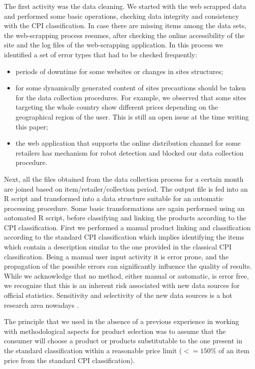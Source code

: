 \documentclass[]{article}
\begin{document}
The first activity was the data cleaning. We started with 
the web scrapped data and performed some basic operations, checking data integrity and consistency with the CPI classification. 
In case there are missing items among the data sets, the web-scrapping process resumes, after checking the online accessibility 
of the site and the log files of the web-scrapping application. In this process we identified a set of error types that had to be checked frequently: 
\begin{itemize}
\item periods of downtime for some websites or changes in sites structures;
\item for some dynamically generated content of sites precautions should be taken for the data collection procedures. For example, we observed that some sites targeting the whole country show different prices depending on the geographical region of the user. This is still an open issue at the time writing this paper;
\item the web application that supports the online distribution channel for some retailers has mechanism for robot detection and blocked our data collection 
procedure.
\end{itemize}


Next, all the files obtained from the data collection process for a certain month are joined based on item/retailer/collection period. The output 
file is fed into an R script and transformed into a data structure suitable for an automatic processing procedure. Some 
basic transformations are again performed using an automated R script, before classifying and linking the products according 
to the CPI classification. First we performed a manual product linking and classification according to the standard CPI 
classification which implies identifying the items which contain a description similar to the one provided in the
classical CPI classification. Being a manual user input activity it is error prone, and the propagation of the possible errors can significantly influence the quality of results. While we acknowledge that no method, either manual or automatic, is error free, we recognize that this is an inherent risk associated with new data sources for official statistics. Sensitivity and selectivity of the new data sources is a hot research area nowadays \cite{reis}.
  

The principle that we used in the absence of a previous experience in working with methodological aspects 
for product selection was to assume that the consumer will choose a product or products substitutable to the one present 
in the standard classification within a reasonable price limit ($<= 150\%$ of an item price from the standard CPI classification). 
\end{document}
